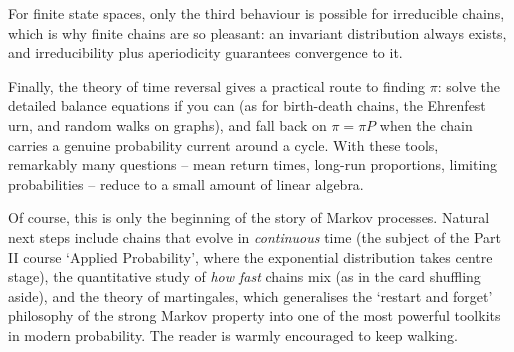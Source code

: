 \documentclass[a4paper]{scrartcl}
\begin{document}
For finite state spaces, only the third behaviour is possible for irreducible chains, which is why finite chains are so pleasant: an invariant distribution always exists, and irreducibility plus aperiodicity guarantees convergence to it.

Finally, the theory of time reversal gives a practical route to finding $\pi$: solve the detailed balance equations if you can (as for birth-death chains, the Ehrenfest urn, and random walks on graphs), and fall back on $\pi = \pi P$ when the chain carries a genuine probability current around a cycle. With these tools, remarkably many questions -- mean return times, long-run proportions, limiting probabilities -- reduce to a small amount of linear algebra.

Of course, this is only the beginning of the story of Markov processes. Natural next steps include chains that evolve in \emph{continuous} time (the subject of the Part II course `Applied Probability', where the exponential distribution takes centre stage), the quantitative study of \emph{how fast} chains mix (as in the card shuffling aside), and the theory of martingales, which generalises the `restart and forget' philosophy of the strong Markov property into one of the most powerful toolkits in modern probability. The reader is warmly encouraged to keep walking.
\end{document}
